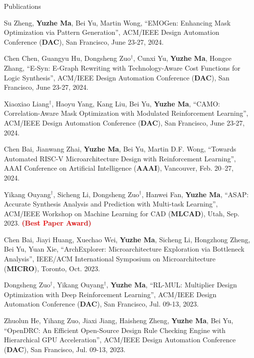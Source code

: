 \begin{rSection}{Publications}
\begin{etaremune}
\item {
    Su Zheng, \textbf{Yuzhe Ma}, Bei Yu, Martin Wong,
    ``EMOGen: Enhancing Mask Optimization via Pattern Generation'',
    ACM/IEEE Design Automation Conference (\textbf{DAC}), San Francisco, June 23-27, 2024.
}

\item {
    Chen Chen, Guangyu Hu, Dongsheng Zuo$^\dagger$, Cunxi Yu, \textbf{Yuzhe Ma}, Hongce Zhang,
    ``E-Syn: E-Graph Rewriting with Technology-Aware Cost Functions for Logic Synthesis'',
    ACM/IEEE Design Automation Conference (\textbf{DAC}), San Francisco, June 23-27, 2024.
}

\item {
    Xiaoxiao Liang$^\dagger$, Haoyu Yang, Kang Liu, Bei Yu, \textbf{Yuzhe Ma},
    ``CAMO: Correlation-Aware Mask Optimization with Modulated Reinforcement Learning'',
    ACM/IEEE Design Automation Conference (\textbf{DAC}), San Francisco, June 23-27, 2024.
}

\item {
    Chen Bai, Jianwang Zhai, \textbf{Yuzhe Ma}, Bei Yu, Martin D.F. Wong,
    ``Towards Automated RISC-V Microarchitecture Design with Reinforcement Learning'',
    AAAI Conference on Artificial Intelligence (\textbf{AAAI}), Vancouver, Feb. 20–27, 2024.
}

\item {
	Yikang Ouyang$^\dagger$, Sicheng Li, Dongsheng Zuo$^\dagger$, Hanwei Fan, \textbf{Yuzhe Ma},
	``ASAP: Accurate Synthesis Analysis and Prediction with Multi-task Learning'',
	ACM/IEEE Workshop on Machine Learning for CAD (\textbf{MLCAD}), Utah, Sep. 2023.
	\textcolor{red}{\textbf{(Best Paper Award)}}
}

\item {
    Chen Bai, Jiayi Huang, Xuechao Wei, \textbf{Yuzhe Ma}, Sicheng Li, Hongzhong Zheng, Bei Yu, Yuan Xie,
    ``ArchExplorer: Microarchitecture Exploration via Bottleneck Analysis'', 
    IEEE/ACM International Symposium on Microarchitecture (\textbf{MICRO}), Toronto, Oct. 2023.
}

\item {
    Dongsheng Zuo$^\dagger$, Yikang Ouyang$^\dagger$, \textbf{Yuzhe Ma},
    ``RL-MUL: Multiplier Design Optimization with Deep Reinforcement Learning'',
    ACM/IEEE Design Automation Conference (\textbf{DAC}), San Francisco, Jul. 09-13, 2023.
}

\item {
    Zhuolun He, Yihang Zuo, Jiaxi Jiang, Haisheng Zheng, \textbf{Yuzhe Ma}, Bei Yu,
    ``OpenDRC: An Efficient Open-Source Design Rule Checking Engine with Hierarchical GPU Acceleration'',
    ACM/IEEE Design Automation Conference (\textbf{DAC}), San Francisco, Jul. 09-13, 2023.
}


\end{etaremune}
\end{rSection}
